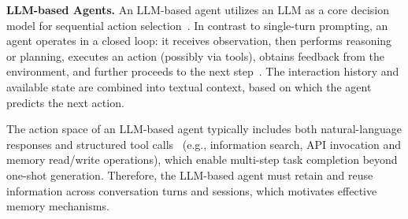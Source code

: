 



{\bf LLM-based Agents.}
An LLM-based agent utilizes an LLM as a core decision model for sequential action selection~\cite{yao2023reactsynergizingreasoningacting,shinn2023reflexion,li2024reviewprominentparadigmsllmbased}. In contrast to single-turn prompting, an agent operates in a closed loop: it receives observation, then performs reasoning or planning, executes an action (possibly via tools), obtains feedback from the environment, and further proceeds to the next step~\cite{yang2026graphbasedagentmemorytaxonomy}. The interaction history and available state are combined into textual context, based on which the agent predicts the next action. 

The action space of an LLM-based agent typically includes both natural-language responses and structured tool calls~\cite{packer2023memgpt, li2025memos} (e.g., information search, API invocation and memory read/write operations), which enable multi-step task completion beyond one-shot generation. Therefore, the LLM-based agent must retain and reuse information across conversation turns and sessions, which motivates effective memory mechanisms.




